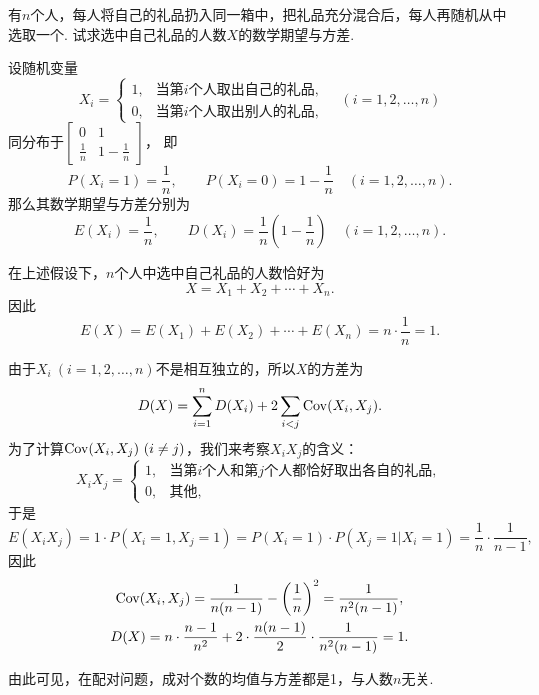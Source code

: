 \begin{example}[配对问题]
有\(n\)个人，每人将自己的礼品扔入同一箱中，把礼品充分混合后，每人再随机从中选取一个.
试求选中自己礼品的人数\(X\)的数学期望与方差.
\begin{solution}
设随机变量\begin{equation*}
    X_i = \left\{ \begin{array}{ll}
    1, & \text{当第\(i\)个人取出自己的礼品}, \\
    0, & \text{当第\(i\)个人取出别人的礼品},
    \end{array} \right.
    \quad(i=1,2,\dotsc,n)
\end{equation*}同分布于\(\begin{bmatrix}
	0 & 1 \\
	\frac{1}{n} & 1-\frac{1}{n}
\end{bmatrix}\)，
即\begin{equation*}
    P(X_i=1) = \frac{1}{n}, \qquad
    P(X_i=0) = 1-\frac{1}{n}
    \quad(i=1,2,\dotsc,n).
\end{equation*}
那么其数学期望与方差分别为\begin{equation*}
    E(X_i) = \frac{1}{n},
    \qquad
    D(X_i) = \frac{1}{n}\left(1-\frac{1}{n}\right)
    \quad(i=1,2,\dotsc,n).
\end{equation*}

在上述假设下，\(n\)个人中选中自己礼品的人数恰好为\begin{equation*}
    X = X_1+X_2+\dotsb+X_n.
\end{equation*}因此\begin{equation*}
    E(X) = E(X_1)+E(X_2)+\dotsb+E(X_n)
    = n \cdot \frac{1}{n}
    = 1.
\end{equation*}

由于\(X_i\ (i=1,2,\dotsc,n)\)不是相互独立的，所以\(X\)的方差为\begin{equation*}
    D(X) = \sum_{i=1}^n D(X_i) + 2 \sum_{i<j} \operatorname{Cov}(X_i,X_j).
\end{equation*}
为了计算\(\operatorname{Cov}(X_i,X_j)\ (i \neq j)\)，我们来考察\(X_i X_j\)的含义：\begin{equation*}
    X_i X_j = \left\{ \begin{array}{ll}
    1, & \text{当第\(i\)个人和第\(j\)个人都恰好取出各自的礼品}, \\
    0, & \text{其他},
    \end{array} \right.
\end{equation*}于是\begin{equation*}
    E(X_i X_j) = 1 \cdot P(X_i=1,X_j=1)
    = P(X_i=1) \cdot P(X_j=1 \vert X_i=1)
    = \frac{1}{n} \cdot \frac{1}{n-1},
\end{equation*}
因此\begin{gather*}
    \operatorname{Cov}(X_i,X_j) = \frac{1}{n(n-1)} - \left(\frac{1}{n}\right)^2
    = \frac{1}{n^2(n-1)}, \\
    D(X) = n \cdot \frac{n-1}{n^2} + 2 \cdot \frac{n(n-1)}{2} \cdot \frac{1}{n^2(n-1)}
    = 1.
\end{gather*}
\end{solution}
由此可见，在配对问题，成对个数的均值与方差都是1，与人数\(n\)无关.
\end{example}

